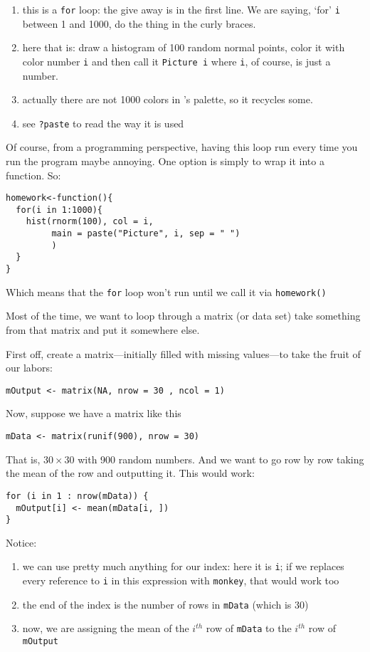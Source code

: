 \begin{enumerate}
\item this is a \texttt{for} loop: the give away is in the first
line.  We are saying, `for' \texttt{i} between 1 and 1000, do the
thing in the curly braces.

\item here that is: draw a histogram of 100 random normal points,
color it with color number \texttt{i} and then call it
\texttt{Picture i} where \texttt{i}, of course, is just a number.

\item actually there are not 1000 colors in \R{}'s palette, so it
recycles some.

\item see \texttt{?paste} to read the way it is used
\end{enumerate}

Of course, from a programming perspective, having this loop run
every time you run the program maybe annoying.  One option is simply
to wrap it into a function.  So:
\begin{verbatim}
homework<-function(){
  for(i in 1:1000){
    hist(rnorm(100), col = i,
         main = paste("Picture", i, sep = " ")
         )
  }
}
\end{verbatim}
Which means that the \texttt{for} loop won't run until we call it
via \texttt{homework()}

Most of the time, we want to loop through a matrix (or data set)
take something from that matrix and put it somewhere else.

First off, create a matrix---initially filled with missing
values---to take the fruit of our labors:
\begin{verbatim}
mOutput <- matrix(NA, nrow = 30 , ncol = 1)
\end{verbatim}
Now, suppose we have a matrix like this

\begin{verbatim}
mData <- matrix(runif(900), nrow = 30)
\end{verbatim}

That is, $30\times30$ with 900 random numbers.  And we want to go
row by row taking the mean of the row and outputting it.  This would
work:
\begin{verbatim}
for (i in 1 : nrow(mData)) {
  mOutput[i] <- mean(mData[i, ])
}
\end{verbatim}

Notice:
\begin{enumerate}
\item we can use pretty much anything for our index: here it is
  \texttt{i}; if we replaces every reference to \texttt{i} in this
  expression with \texttt{monkey}, that would work too

\item the end of the index is the number of rows in \texttt{mData}
  (which is 30)

\item now, we are assigning the mean of the $i^{th}$ row of
\texttt{mData} to the $i^{th}$ row of \texttt{mOutput}
\end{enumerate}

